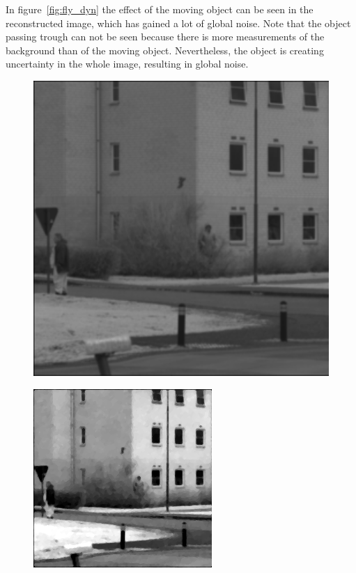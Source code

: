 In figure~\ref{fig:fly_dyn} the effect of the moving object can be seen in the reconstructed image, which has gained a lot of global noise. Note that the object passing trough can not be seen because there is more measurements of the background than of the moving object. Nevertheless, the object is creating uncertainty in the whole image, resulting in global noise.   

\begin{figure}[H]
    \centering
\begin{minipage}[t]{0.32\textwidth}
    \includegraphics[width=1\textwidth]{result/dynamic/fly/flyby_1sec_org.png}
    \subcaption{}
    \label{fig:fly_1}
\end{minipage}
\begin{minipage}[t]{0.32\textwidth}
    \includegraphics[width = \textwidth]{result/dynamic/fly/flyby_1sec_ref.png}

\end{minipage}
\end{figure}
